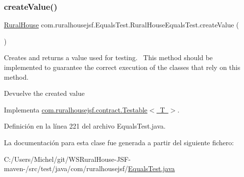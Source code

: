 \subsubsection{\texorpdfstring{createValue()}{createValue()}}
{\footnotesize\ttfamily \mbox{\hyperlink{classcom_1_1ruralhousejsf_1_1domain_1_1_rural_house}{Rural\+House}} com.\+ruralhousejsf.\+Equals\+Test.\+Rural\+House\+Equals\+Test.\+create\+Value (\begin{DoxyParamCaption}{ }\end{DoxyParamCaption})}

Creates and returns a value used for testing.~\newline
 This method should be implemented to guarantee the correct execution of the classes that rely on this method.

\begin{DoxyReturn}{Devuelve}
the created value 
\end{DoxyReturn}


Implementa \mbox{\hyperlink{interfacecom_1_1ruralhousejsf_1_1contract_1_1_testable_ae4546a381488faaba1ef7c0f8688de9c}{com.\+ruralhousejsf.\+contract.\+Testable$<$ T $>$}}.



Definición en la línea 221 del archivo Equals\+Test.\+java.



La documentación para esta clase fue generada a partir del siguiente fichero\+:\begin{DoxyCompactItemize}
\item 
C\+:/\+Users/\+Michel/git/\+W\+S\+Rural\+House-\/\+J\+S\+F-\/maven-\//src/test/java/com/ruralhousejsf/\mbox{\hyperlink{_equals_test_8java}{Equals\+Test.\+java}}\end{DoxyCompactItemize}
